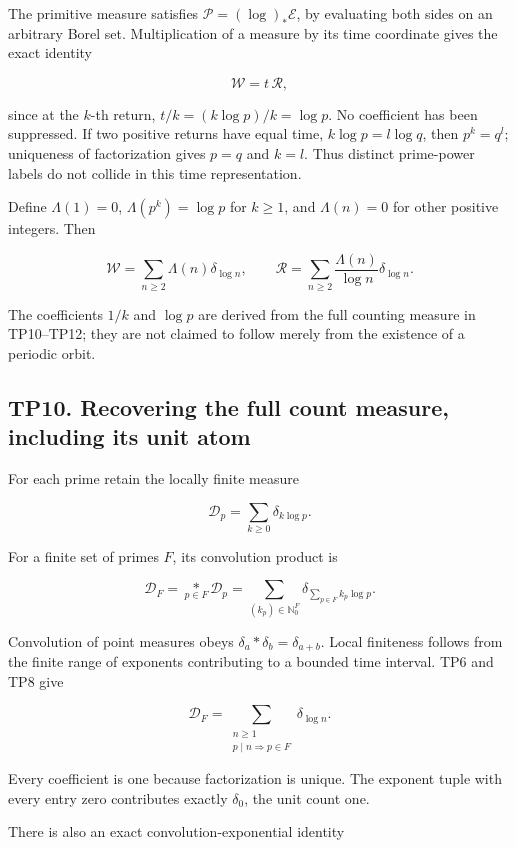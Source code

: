 \documentclass[
]{article}
\begin{document}
The primitive measure satisfies \(\mathcal P=(\log)_*\mathcal E\), by
evaluating both sides on an arbitrary Borel set. Multiplication of a
measure by its time coordinate gives the exact identity

\[
\mathcal W=t\,\mathcal R,
\]

since at the \(k\)-th return, \(t/k=(k\log p)/k=\log p\). No coefficient
has been suppressed. If two positive returns have equal time,
\(k\log p=l\log q\), then \(p^k=q^l\); uniqueness of factorization gives
\(p=q\) and \(k=l\). Thus distinct prime-power labels do not collide in
this time representation.

Define \(\Lambda(1)=0\), \(\Lambda(p^k)=\log p\) for \(k\ge1\), and
\(\Lambda(n)=0\) for other positive integers. Then

\[
\mathcal W=\sum_{n\ge2}\Lambda(n)\delta_{\log n},
\qquad
\mathcal R=\sum_{n\ge2}\frac{\Lambda(n)}{\log n}\delta_{\log n}.
\]

The coefficients \(1/k\) and \(\log p\) are derived from the full
counting measure in TP10--TP12; they are not claimed to follow merely
from the existence of a periodic orbit.

\subsection{TP10. Recovering the full count measure, including its unit
atom}\label{tp10.-recovering-the-full-count-measure-including-its-unit-atom}

For each prime retain the locally finite measure

\[
\mathcal D_p=\sum_{k\ge0}\delta_{k\log p}.
\]

For a finite set of primes \(F\), its convolution product is

\[
\mathcal D_F=\underset{p\in F}{*}\mathcal D_p
=\sum_{(k_p)\in\mathbb N_0^F}
\delta_{\sum_{p\in F}k_p\log p}.
\]

Convolution of point measures obeys \(\delta_a*\delta_b=\delta_{a+b}\).
Local finiteness follows from the finite range of exponents contributing
to a bounded time interval. TP6 and TP8 give

\[
\mathcal D_F=
\sum_{\substack{n\ge1\\p\mid n\Rightarrow p\in F}}
\delta_{\log n}.
\]

Every coefficient is one because factorization is unique. The exponent
tuple with every entry zero contributes exactly \(\delta_0\), the unit
count one.

There is also an exact convolution-exponential identity
\end{document}
